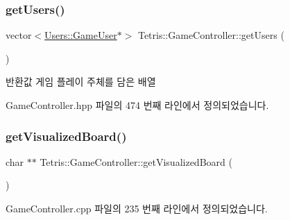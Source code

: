 \subsubsection{\texorpdfstring{get\+Users()}{getUsers()}}
{\footnotesize\ttfamily vector$<$\hyperlink{class_tetris_1_1_users_1_1_game_user}{Users\+::\+Game\+User}$\ast$$>$ Tetris\+::\+Game\+Controller\+::get\+Users (\begin{DoxyParamCaption}{ }\end{DoxyParamCaption})\hspace{0.3cm}{\ttfamily [inline]}}

\begin{DoxyReturn}{반환값}
게임 플레이 주체를 담은 배열 
\end{DoxyReturn}


Game\+Controller.\+hpp 파일의 474 번째 라인에서 정의되었습니다.

\mbox{\label{class_tetris_1_1_game_controller_a78b39bdb39707e119d6e708bdb2aca17}} 
\subsubsection{\texorpdfstring{get\+Visualized\+Board()}{getVisualizedBoard()}\hspace{0.1cm}{\footnotesize\ttfamily [1/2]}}
{\footnotesize\ttfamily char $\ast$$\ast$ Tetris\+::\+Game\+Controller\+::get\+Visualized\+Board (\begin{DoxyParamCaption}{ }\end{DoxyParamCaption})}



Game\+Controller.\+cpp 파일의 235 번째 라인에서 정의되었습니다.

